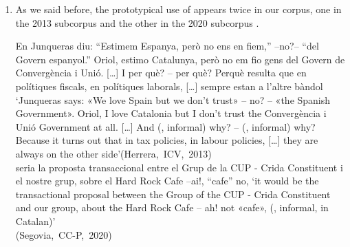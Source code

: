 \documentclass[output=paper]{langscibook}
\begin{document}
\begin{enumerate}[label=\alph*.]
\ea\label{ex:nogue:18}
{{de què serveix tenir el 50 per cent de participació en l’IVA, si després resulta que quan}  {els IVA}  {no}  {cap rendiment addicional} […]?}
\glt `what is the use of having a 50 per cent share of VAT, if afterwards when   VAT    any additional revenue […]?'\\
\hfill\hbox{(Mas, President of Catalonia, 2013)}\\
\z 


Most probably, beyond the reference to participants, the generic use of the  can be considered as a marker of informality in the stylistic evolution of parliamentary discourse – and in our corpus also an individual feature of one participant, the President of Catalonia in 2013.\largerpage[2]



\item As we said before, the prototypical use of  appears twice in our corpus, one in the 2013 subcorpus  and the other in the 2020 subcorpus .

\ea\label{ex:nogue:19}
 \ea\label{ex:nogue:19a}
{En Junqueras diu: “Estimem Espanya, però no ens en fiem,” –no?– “del Govern espanyol.” Oriol, estimo Catalunya, però no em fio gens del Govern de Convergència i Unió.} […] {I}  {per què? –} {per què? Perquè resulta que en polítiques fiscals, en polítiques laborals,} […] {sempre estan a l’altre bàndol}
\pagebreak\glt `Junqueras says: «We love Spain but we don’t trust» – no? – «the Spanish Government». Oriol, I love Catalonia but I don’t trust the Convergència i Unió Government at all. […] And    (,  informal) why? –    (,  informal) why? Because it turns out that in tax policies, in labour policies, […] they are always on the other side'\hfill\hbox{(Herrera, ICV, 2013)}\\

 \ex\label{ex:nogue:19b}
{seria la proposta transaccional entre el Grup de la CUP - Crida Constituent i el nostre grup, sobre el Hard Rock Cafe –ai!, “cafe” no,} 
\glt `it would be the transactional proposal between the Group of the CUP - Crida Constituent and our group, about the Hard Rock Cafe – ah! not «cafe»,  (,  informal, in Catalan)'\\
\hfill\hbox{(Segovia, CC-P, 2020)}\\
\z
\z 



\end{enumerate}
\end{document}
